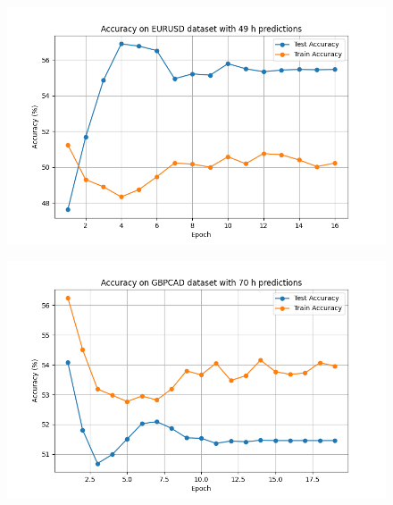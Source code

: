 \begin{figure}[h!]

	\centering
	\includegraphics[width=\linewidth]{"pictures/eurusd_49h_results.png"}
	\caption{}
	\label{fig:eurusud_fig}
\end{figure}

\begin{figure}[h!]

	\centering
	\includegraphics[width=\linewidth]{"pictures/gbpcad_70h_results.png"}
	\caption{}
	\label{fig:gbpcad_fig}
\end{figure}

